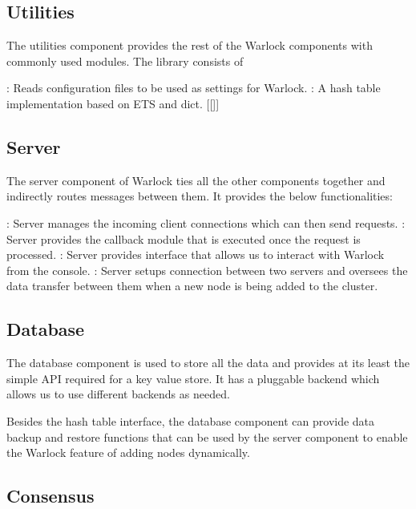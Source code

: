 \subsection{Utilities}

The utilities component provides the rest of the Warlock components with 
commonly used modules. The library consists of

\begin{itemize}
    : Reads configuration files to be used as 
    settings for Warlock.
    : A hash table implementation based on ETS and dict. [[]]
\end{itemize}

\subsection{Server}

The server component of Warlock ties all the other components together and 
indirectly routes messages between them. It provides the below functionalities:

\begin{itemize}
    : Server manages the incoming client 
    connections which can then send requests.
    : Server provides the callback module that is executed
    once the request is processed.
    : Server provides interface that allows us to interact with
    Warlock from the console.
    : Server setups connection between two servers and 
    oversees the data transfer between them when a new node is being added to
    the cluster.
\end{itemize}

\subsection{Database}

The database component is used to store all the data and provides at its
least the simple API required for a key value store. It has a pluggable backend 
which allows us to use different backends as needed.

Besides the hash table interface, the database component can provide data
backup and restore functions that can be used by the server component to
enable the Warlock feature of adding nodes dynamically.

\subsection{Consensus}

